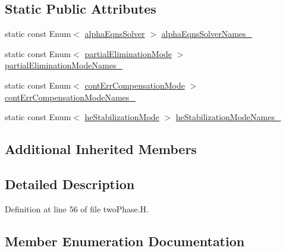 \subsection*{Static Public Attributes}
\begin{DoxyCompactItemize}
\item 
static const Enum$<$ \hyperlink{classFoam_1_1thermalHydraulicsModels_1_1twoPhase_a319777e04650d1592385e5abf6c733f2}{alpha\+Eqns\+Solver} $>$ \hyperlink{classFoam_1_1thermalHydraulicsModels_1_1twoPhase_a4daf9c64d7a33227e1b24bfda446b456}{alpha\+Eqns\+Solver\+Names\+\_\+}
\item 
static const Enum$<$ \hyperlink{classFoam_1_1thermalHydraulicsModels_1_1twoPhase_a9d5e2d3da847e80d9b9ce2a5c2c2aec7}{partial\+Elimination\+Mode} $>$ \hyperlink{classFoam_1_1thermalHydraulicsModels_1_1twoPhase_a90b727e0e0bfd6018183e9f5fb174649}{partial\+Elimination\+Mode\+Names\+\_\+}
\item 
static const Enum$<$ \hyperlink{classFoam_1_1thermalHydraulicsModels_1_1twoPhase_ae6911eca2d1883f717ac31bedd626771}{cont\+Err\+Compensation\+Mode} $>$ \hyperlink{classFoam_1_1thermalHydraulicsModels_1_1twoPhase_af60d597515cb0e9dceb49fef20dce6a5}{cont\+Err\+Compensation\+Mode\+Names\+\_\+}
\item 
static const Enum$<$ \hyperlink{classFoam_1_1thermalHydraulicsModels_1_1twoPhase_a267c0cac9152d0c90cbba342a131a26e}{he\+Stabilization\+Mode} $>$ \hyperlink{classFoam_1_1thermalHydraulicsModels_1_1twoPhase_af02a4f231a65729467fc0f13e2ffe155}{he\+Stabilization\+Mode\+Names\+\_\+}
\end{DoxyCompactItemize}
\subsection*{Additional Inherited Members}


\subsection{Detailed Description}


Definition at line 56 of file two\+Phase.\+H.



\subsection{Member Enumeration Documentation}
\mbox{\label{classFoam_1_1thermalHydraulicsModels_1_1twoPhase_a319777e04650d1592385e5abf6c733f2}} 
